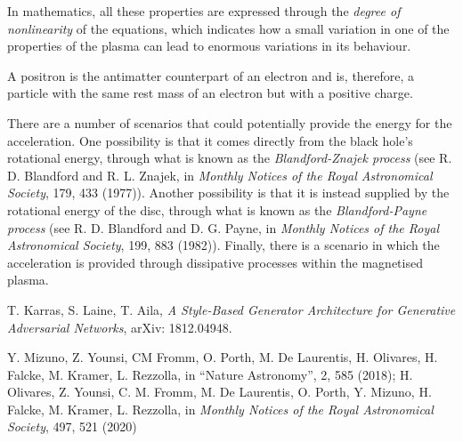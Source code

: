 \begin{description}[style=multiline,leftmargin=2em,labelwidth=1.5em]
\item[7.]\hypertarget{note:07-07}{}In mathematics, all these properties are expressed through the \emph{degree of
nonlinearity} of the equations, which indicates how a small variation in one of the
properties of the plasma can lead to enormous variations in its behaviour.

\item[8.]\hypertarget{note:07-08}{}A positron is the antimatter counterpart of an electron and is, therefore, a particle
with the same rest mass of an electron but with a positive charge.

\item[9.]\hypertarget{note:07-09}{}There are a number of scenarios that could potentially provide the energy for the
acceleration. One possibility is that it comes directly from the black hole's rotational
energy, through what is known as the \emph{Blandford-Znajek process} (see R. D.
Blandford and R. L. Znajek, in \emph{Monthly Notices of the Royal Astronomical Society},
179, 433 (1977)). Another possibility is that it is instead supplied by the rotational
energy of the disc, through what is known as the \emph{Blandford-Payne process} (see R.
D. Blandford and D. G. Payne, in \emph{Monthly Notices of the Royal Astronomical
Society}, 199, 883 (1982)). Finally, there is a scenario in which the acceleration is
provided through dissipative processes within the magnetised plasma.

\item[10.]\hypertarget{note:07-10}{}T. Karras, S. Laine, T. Aila, \emph{A Style-Based Generator Architecture for Generative
Adversarial Networks}, arXiv: 1812.04948.

\item[11.]\hypertarget{note:07-11}{}Y. Mizuno, Z. Younsi, CM Fromm, O. Porth, M. De Laurentis, H. Olivares, H. Falcke, M.
Kramer, L. Rezzolla, in ``Nature Astronomy'', 2, 585 (2018); H. Olivares, Z. Younsi, C.
M. Fromm, M. De Laurentis, O. Porth, Y. Mizuno, H. Falcke, M. Kramer, L. Rezzolla, in
\emph{Monthly Notices of the Royal Astronomical Society}, 497, 521 (2020)

\end{description}
